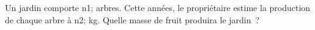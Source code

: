 \documentclass[exercice]{thedocument}%
\begin{document}
%
Un jardin comporte \<n1; arbres. Cette années, le propriétaire estime la
production de chaque arbre à \<n2; kg.\vskip10pt\noindent
Quelle masse de fruit produira le jardin~?
\end{document}
